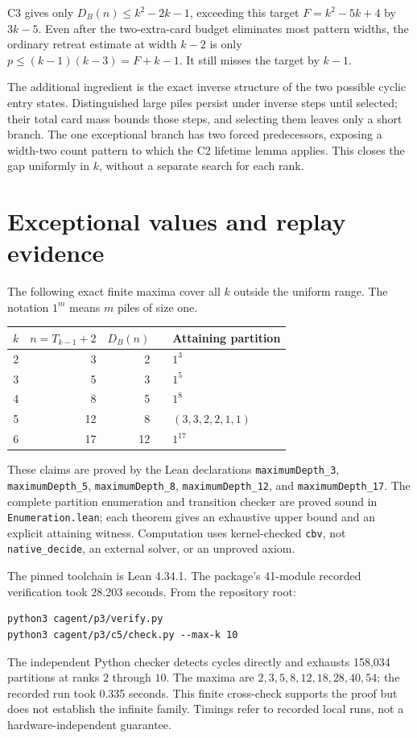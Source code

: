 \documentclass[11pt,a4paper]{article}
\begin{document}
C3 gives only $D_B(n)\le k^2-2k-1$, exceeding this target $F=k^2-5k+4$ by $3k-5$. Even after the two-extra-card budget eliminates most pattern widths, the ordinary retreat estimate at width $k-2$ is only $p\le(k-1)(k-3)=F+k-1$. It still misses the target by $k-1$.

The additional ingredient is the exact inverse structure of the two possible cyclic entry states. Distinguished large piles persist under inverse steps until selected; their total card mass bounds those steps, and selecting them leaves only a short branch. The one exceptional branch has two forced predecessors, exposing a width-two count pattern to which the C2 lifetime lemma applies. This closes the gap uniformly in $k$, without a separate search for each rank.
\section{Exceptional values and replay evidence}
The following exact finite maxima cover all $k$ outside the uniform range. The notation $1^m$ means $m$ piles of size one.
\begin{center}
\begin{tabular}{rrrrl}
\toprule
$k$ & $n=T_{k-1}+2$ & $D_B(n)$ & & Attaining partition\\
\midrule
2&3&2&&$1^3$\\
3&5&3&&$1^5$\\
4&8&5&&$1^8$\\
5&12&8&&$(3,3,2,2,1,1)$\\
6&17&12&&$1^{17}$\\
\bottomrule
\end{tabular}
\end{center}
These claims are proved by the Lean declarations \texttt{maximumDepth\_3}, \texttt{maximumDepth\_5}, \texttt{maximumDepth\_8}, \texttt{maximumDepth\_12}, and \texttt{maximumDepth\_17}. The complete partition enumeration and transition checker are proved sound in \texttt{Enumeration.lean}; each theorem gives an exhaustive upper bound and an explicit attaining witness. Computation uses kernel-checked \texttt{cbv}, not \texttt{native\_decide}, an external solver, or an unproved axiom.

The pinned toolchain is Lean 4.34.1. The package's 41-module recorded verification took 28.203 seconds. From the repository root:
\begin{verbatim}
python3 cagent/p3/verify.py
python3 cagent/p3/c5/check.py --max-k 10
\end{verbatim}
The independent Python checker detects cycles directly and exhausts 158,034 partitions at ranks $2$ through $10$. The maxima are $2,3,5,8,12,18,28,40,54$; the recorded run took 0.335 seconds. This finite cross-check supports the proof but does not establish the infinite family. Timings refer to recorded local runs, not a hardware-independent guarantee.
\end{document}
